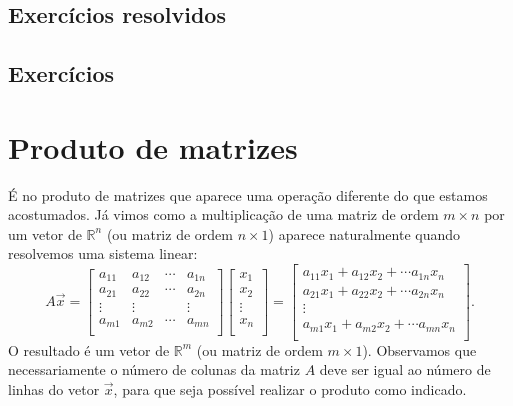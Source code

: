 \subsection*{Exercícios resolvidos}

\construirExeresol

\subsection*{Exercícios}

\construirExer


\section{Produto de matrizes}

É no produto de matrizes que aparece uma operação diferente do que estamos acostumados. Já vimos como a multiplicação de uma matriz de ordem $m\times n$ por um vetor de $\mathbb{R}^n$ (ou matriz de ordem $n\times 1$) aparece naturalmente quando resolvemos uma sistema linear:
\begin{equation}
A \vec{x} = \left[
\begin{array}{cccc}
a_{11} & a_{12} & \cdots & a_{1n} \\
a_{21} & a_{22} & \cdots & a_{2n} \\
\vdots & \vdots &        & \vdots \\
a_{m1} & a_{m2} & \cdots & a_{mn} \\
\end{array}
\right]
\left[
\begin{array}{c}
x_{1} \\
x_{2} \\
\vdots \\
x_{n} \\
\end{array}
\right] =
\left[
\begin{array}{c}
a_{11} x_{1} + a_{12} x_{2} + \cdots  a_{1n} x_{n} \\
a_{21} x_{1} + a_{22} x_{2} + \cdots  a_{2n} x_{n} \\
\vdots \\
a_{m1} x_{1} + a_{m2} x_{2} + \cdots  a_{mn} x_{n} \\
\end{array}
\right].
\end{equation} O resultado é um vetor  de $\mathbb{R}^m$ (ou matriz de ordem $m\times 1$). Observamos que necessariamente o número de colunas da matriz $A$ deve ser igual ao número de linhas do vetor $\vec{x}$, para que seja possível realizar o produto como indicado.

